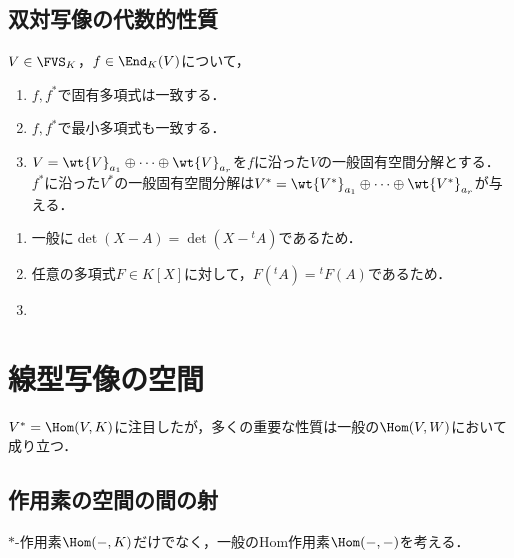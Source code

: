 \documentclass[uplatex, dvipdfmx]{jsreport}
\begin{document}
\subsection{双対写像の代数的性質}

\begin{proposition}
    $V\in\FVS_K$，$f\in\End_K(V)$について，
    \begin{enumerate}
        \item $f,f^*$で固有多項式は一致する．
        \item $f,f^*$で最小多項式も一致する．
        \item $V=\wt{V}_{a_1}\oplus\cdots\oplus\wt{V}_{a_r}$を$f$に沿った$V$の一般固有空間分解とする．
        $f^*$に沿った$V^*$の一般固有空間分解は$V^*=\wt{V^*}_{a_1}\oplus\cdots\oplus\wt{V^*}_{a_r}$が与える．
    \end{enumerate}
\end{proposition}
\begin{Proof}\mbox{}
    \begin{enumerate}
        \item 一般に$\det(X-A)=\det(X-{}^t\!A)$であるため．
        \item 任意の多項式$F\in K[X]$に対して，$F({}^t\!A)={}^t\!F(A)$であるため．
        \item 
    \end{enumerate}
\end{Proof}

\section{線型写像の空間}

\begin{tcolorbox}[colframe=ForestGreen, colback=ForestGreen!10!white,breakable,colbacktitle=ForestGreen!40!white,coltitle=black,fonttitle=\bfseries\sffamily,
title=]
    $V^*=\Hom(V,K)$に注目したが，多くの重要な性質は一般の$\Hom(V,W)$において成り立つ．
\end{tcolorbox}

\subsection{作用素の空間の間の射}

\begin{tcolorbox}[colframe=ForestGreen, colback=ForestGreen!10!white,breakable,colbacktitle=ForestGreen!40!white,coltitle=black,fonttitle=\bfseries\sffamily,
title=]
    $*$-作用素$\Hom(-,K)$だけでなく，一般のHom作用素$\Hom(-,-)$を考える．
\end{tcolorbox}
\end{document}
